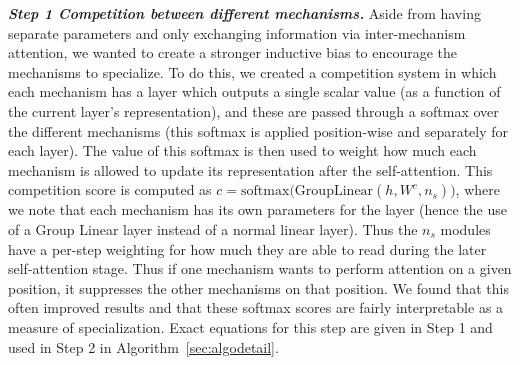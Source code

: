 \documentclass{article}
\begin{document}
\begin{algorithm}[h]
\end{algorithm}



{\bfseries \itshape Step 1 Competition between different mechanisms.} Aside from having separate parameters and only exchanging information via inter-mechanism attention, we wanted to create a stronger inductive bias to encourage the mechanisms to specialize.  To do this, we created a competition system in which each mechanism has a layer which outputs a single scalar value (as a function of the current layer's representation), and these are passed through a softmax over the different mechanisms (this softmax is applied position-wise and separately for each layer).  The value of this softmax is then used to weight how much each mechanism is allowed to update its representation after the self-attention.  This competition score is computed as $c = \mathrm{softmax}\big(\mathrm{GroupLinear}(h, W^c, n_s)\big)$, where we note that each mechanism has its own parameters for the layer (hence the use of a Group Linear layer instead of a normal linear layer).  Thus the $n_s$ modules have a per-step weighting for how much they are able to read during the later self-attention stage.  Thus if one mechanism wants to perform attention on a given position, it suppresses the other mechanisms on that position.  We found that this often improved results and that these softmax scores are fairly interpretable as a measure of specialization.  Exact equations for this step are given in Step 1 and used in Step 2 in Algorithm~\ref{sec:algodetail}.  

\end{document}
